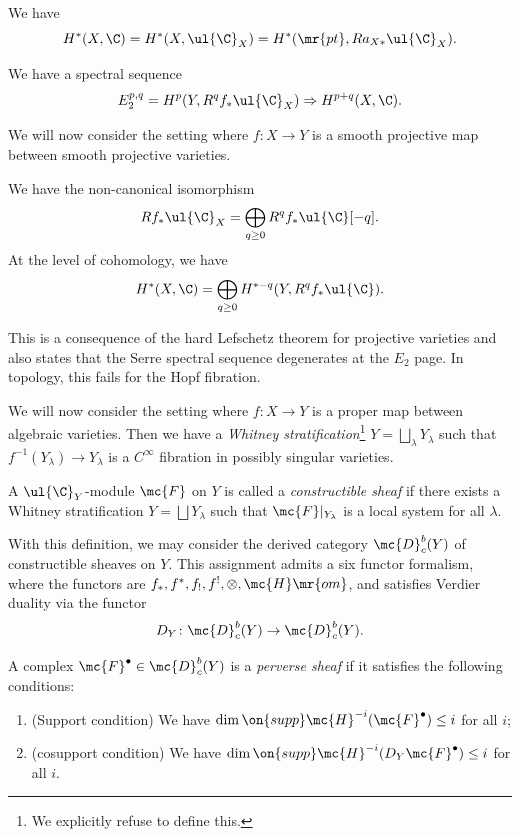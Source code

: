 \begin{prop}
    We have
    \[ H^*(X, \C) = H^*(X, \ul{\C}_X) = H^*(\mr{pt}, R a_{X*} \ul{\C}_X). \]
\end{prop}

\begin{thm}
    We have a spectral sequence
    \[ E_2^{p,q} = H^p(Y, R^q f_* \ul{\C}_X) \Rightarrow H^{p+q}(X, \C). \]
\end{thm}

We will now consider the setting where \(f \colon X \to Y\) is a smooth projective map between smooth projective varieties.

\begin{thm}
    We have the non-canonical isomorphism
    \[ R f_* \ul{\C}_X = \bigoplus_{q \geq 0} R^q f_* \ul{\C}[-q]. \]
    At the level of cohomology, we have
    \[ H^*(X, \C) = \bigoplus_{q \geq 0} H^{*-q}(Y, R^q f_* \ul{\C}). \]
\end{thm}

This is a consequence of the hard Lefschetz theorem for projective varieties and also states that the Serre spectral sequence degenerates at the \(E_2\) page. In topology, this fails for the Hopf fibration.

We will now consider the setting where \(f \colon X \to Y\) is a proper map between algebraic varieties. Then we have a \textit{Whitney stratification}\footnote{We explicitly refuse to define this.} \(Y = \bigsqcup_{\lambda} Y_{\lambda}\) such that \(f^{-1}(Y_{\lambda}) \to Y_{\lambda}\) is a \(C^{\infty}\) fibration in possibly singular varieties.

\begin{defn}
    A \(\ul{\C}_Y\)-module \(\mc{F}\) on \(Y\) is called a \textit{constructible sheaf} if there exists a Whitney stratification \(Y = \bigsqcup Y_{\lambda}\) such that \(\mc{F}|_{Y_{\lambda}}\) is a local system for all \(\lambda\).
\end{defn}

With this definition, we may consider the derived category \(\mc{D}_c^b(Y)\) of constructible sheaves on \(Y\). This assignment admits a six functor formalism, where the functors are \(f_*, f^*, f_!, f^!, \otimes, \mc{H}\mr{om}\), and satisfies Verdier duality via the functor
\[ D_Y \colon \mc{D}_c^b(Y) \to \mc{D}_c^b(Y). \]

\begin{defn}
    A complex \(\mc{F}^{\bullet} \in \mc{D}_c^b(Y)\) is a \textit{perverse sheaf} if it satisfies the following conditions:
    \begin{enumerate}
        \item (Support condition) We have \(\dim \on{supp} \mc{H}^{-i}(\mc{F}^{\bullet}) \leq i\) for all \(i\);
        \item (cosupport condition) We have \(\dim \on{supp} \mc{H}^{-i}(D_Y \mc{F}^{\bullet}) \leq i\) for all \(i\).
    \end{enumerate}
\end{defn}

